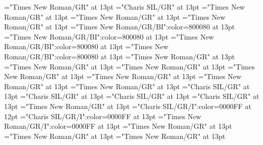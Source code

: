\documentclass[a4paper]{article}
\begin{document}
\font\spanenpronunciationggofonipaxemicpronunciationsentryletDatadicBody="Times New Roman/GR" at 13pt
\font\spanggofonipaxemicpronunciationggofonipaxemicpronunciationsentryletDatadicBody="Charis SIL/GR" at 13pt
\font\spanenpronunciationsentryletDatadicBody="Times New Roman/GR" at 13pt
\font\sensesentryletDatadicBody="Times New Roman/GR" at 13pt
\font\sensesensesentryletDatadicBody="Times New Roman/GR" at 13pt
\font\grammaticalinfosensesensesentryletDatadicBody="Times New Roman/GR/BI":color=800080 at 13pt
\font\partofspeechengrammaticalinfosensesensesentryletDatadicBody="Times New Roman/GR/BI":color=800080 at 13pt
\font\spanenpartofspeechengrammaticalinfosensesensesentryletDatadicBody="Times New Roman/GR/BI":color=800080 at 13pt
\font\spanengrammaticalinfosensesensesentryletDatadicBody="Times New Roman/GR/BI":color=800080 at 13pt
\font{}="Times New Roman/GR" at 13pt
\font\spanendefinitionensensesensesentryletDatadicBody="Times New Roman/GR" at 13pt
\font\LexSensepublishStemDefinitionPubensensesensesentryletDatadicBody="Times New Roman/GR" at 13pt
\font\spanenLexSensepublishStemDefinitionPubensensesensesentryletDatadicBody="Times New Roman/GR" at 13pt
\font\LexSensepublishStemGlossPubLcensensesensesentryletDatadicBody="Times New Roman/GR" at 13pt
\font\xitemenLexSensepublishStemGlossPubLcensensesensesentryletDatadicBody="Times New Roman/GR" at 13pt
\font\spanenxitemenLexSensepublishStemGlossPubLcensensesensesentryletDatadicBody="Times New Roman/GR" at 13pt
\font\xitemhiLexSensepublishStemGlossPubLcensensesensesentryletDatadicBody="Charis SIL/GR" at 13pt
\font\spanhixitemhiLexSensepublishStemGlossPubLcensensesensesentryletDatadicBody="Charis SIL/GR" at 13pt
\font\xitemteLexSensepublishStemGlossPubLcensensesensesentryletDatadicBody="Charis SIL/GR" at 13pt
\font\spantexitemteLexSensepublishStemGlossPubLcensensesensesentryletDatadicBody="Charis SIL/GR" at 13pt
\font\examplessensesensesentryletDatadicBody="Times New Roman/GR" at 13pt
\font\exampleggoTeluINexamplessensesensesentryletDatadicBody="Charis SIL/GR/I":color=0000FF at 12pt
\font\spanggoTeluINexampleggoTeluINexamplessensesensesentryletDatadicBody="Charis SIL/GR/I":color=0000FF at 13pt
\font\spanenexampleggoTeluINexamplessensesensesentryletDatadicBody="Times New Roman/GR/I":color=0000FF at 13pt
\font\translationsexamplessensesensesentryletDatadicBody="Times New Roman/GR" at 13pt
\font\CmTranslationpublishStemTypeConfigtranslationsexamplessensesensesentryletDatadicBody="Times New Roman/GR" at 13pt
\font\CmPossibilitypublishStemTransTypeAbbreviationPubenCmTranslationpublishStemTypeConfigtranslationsexamplessensesensesentryletDatadicBody="Times New Roman/GR" at 13pt
\end{document}
